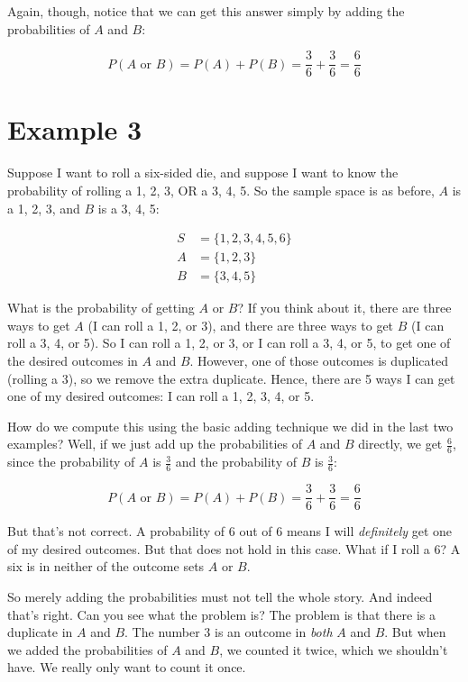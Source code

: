 \documentclass[../../../main.tex]{subfiles}
\begin{document}
Again, though, notice that we can get this answer simply by adding the probabilities of $A$ and $B$:

\begin{equation*}
  P(A \text{ or } B) = P(A) + P(B) = \frac{3}{6} + \frac{3}{6} = \frac{6}{6}
\end{equation*}


\section{Example 3}

Suppose I want to roll a six-sided die, and suppose I want to know the probability of rolling a 1, 2, 3, OR a 3, 4, 5. So the sample space is as before, $A$ is a 1, 2, 3, and $B$ is a 3, 4, 5:

\begin{align*}
  S &= \{ 1, 2, 3, 4, 5, 6 \} \\
  A &= \{ 1, 2, 3 \} \\
  B &= \{ 3, 4, 5 \}
\end{align*}

\noindent
What is the probability of getting $A$ or $B$? If you think about it, there are three ways to get $A$ (I can roll a 1, 2, or 3), and there are three ways to get $B$ (I can roll a 3, 4, or 5). So I can roll a 1, 2, or 3, or I can roll a 3, 4, or 5, to get one of the desired outcomes in $A$ and $B$. However, one of those outcomes is duplicated (rolling a 3), so we remove the extra duplicate. Hence, there are 5 ways I can get one of my desired outcomes: I can roll a 1, 2, 3, 4, or 5.

How do we compute this using the basic adding technique we did in the last two examples? Well, if we just add up the probabilities of $A$ and $B$ directly, we get $\frac{6}{6}$, since the probability of $A$ is $\frac{3}{6}$ and the probability of $B$ is $\frac{3}{6}$:

\begin{equation*}
  P(A \text{ or } B) = P(A) + P(B) = \frac{3}{6} + \frac{3}{6} = \frac{6}{6}
\end{equation*}

\noindent
But that's not correct. A probability of 6 out of 6 means I will \emph{definitely} get one of my desired outcomes. But that does not hold in this case. What if I roll a 6? A six is in neither of the outcome sets $A$ or $B$. 

So merely adding the probabilities must not tell the whole story. And indeed that's right. Can you see what the problem is? The problem is that there is a duplicate in $A$ and $B$. The number 3 is an outcome in \emph{both} $A$ and $B$. But when we added the probabilities of $A$ and $B$, we counted it twice, which we shouldn't have. We really only want to count it once. 
\end{document}
